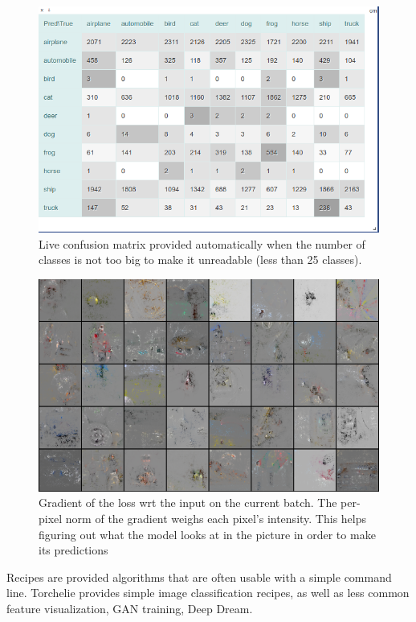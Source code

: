 \begin{figure}[h]
    \centering
    \includegraphics[width=\columnwidth]{90-files/confmatrix.png}
    \caption{Live confusion matrix provided automatically when the number of classes is not too big to make it unreadable (less than 25 classes).}
    \label{fig:confmatrix}
\end{figure}

\begin{figure}
    \centering
    \includegraphics[width=\columnwidth]{90-files/gradients.png}
    \caption{Gradient of the loss wrt the input on the current batch. The per-pixel norm of the gradient weighs each pixel's intensity. This helps figuring out what the model looks at in the picture in order to make its predictions}
    \label{fig:gradients}
\end{figure}

Recipes are provided algorithms that are often usable with a simple command line. Torchelie provides simple image classification recipes, as well as less common feature visualization, GAN training, Deep Dream.

